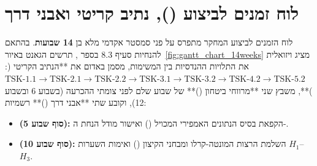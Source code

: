 \section{לוח זמנים לביצוע (), נתיב קריטי ואבני דרך}
\label{sec:gantt_schedule}

לוח הזמנים לביצוע המחקר מתפרס על פני סמסטר אקדמי מלא בן \textbf{\num{14} שבועות}. בהתאם להנחיות סעיף \num{8.3} בספר \cite{segal2026prep}, תרשים הגאנט באיור~\ref{fig:gantt_chart_14weeks} מציג ויזואלית את התלויות ההנדסיות בין המשימות, מסמן באדום את **הנתיב הקריטי (: $\text{TSK-1.1} \to \text{TSK-2.1} \to \text{TSK-2.2} \to \text{TSK-3.1} \to \text{TSK-3.2} \to \text{TSK-4.2} \to \text{TSK-5.2}$)**, משבץ שני **מרווחי ביטחון ()** של שבוע שלם לפני צומתי ההכרעה (בשבוע \num{6} ובשבוע \num{12}), וקובע שתי **אבני דרך ()** רשמיות:
\begin{itemize}[rightmargin=0.6cm]
  \item \textbf{ (סוף שבוע \num{5}):} הקפאת בסיס הנתונים האמפירי המכויל () ואישור מודל הנחת ה-.
  \item \textbf{ (סוף שבוע \num{10}):} השלמת הרצות המונטה-קרלו ומבחני הקיצון () ואימות השערות $H_1$--$H_3$.
\end{itemize}

